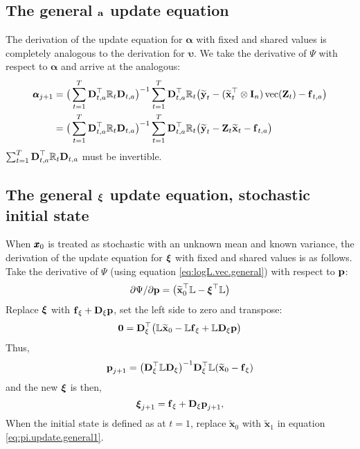 \documentclass[]{article}
\def\uupsilon{\pmb{\upsilon}}
\def\aalpha{\pmb{\alpha}}
\def\xixi{\mbox{\boldmath $\xi$}}
\def\LAMm{\mathbb{L}}
\def\ZZ{\mbox{$\mathbf Z$}}	\def\zz{\mbox{$\mathbf z$}}
\def\DD{\mbox{$\mathbf D$}}	\def\dd{\mbox{$\mathbf d$}}
\def\II{\mbox{$\mathbf I$}} \def\ii{\mbox{$\mathbf i$}}
\def\vec{\,\textup{\textrm{vec}}}
\def\hatxt{\widetilde{\mbox{$\mathbf x$}}_t}
\def\hatyt{\widetilde{\mbox{$\mathbf y$}}_t}
\begin{document}
\subsection{The general $\aa$ update equation}\label{sec:constA}
The derivation of the update equation for $\aalpha$ with fixed and shared values is completely analogous to the derivation for $\uupsilon$. We take the derivative of $\Psi$ with respect to $\aalpha$ and arrive at the analogous:
\begin{equation}\label{eq:general.a.update}
\begin{split}
\aalpha_{j+1} &= \big(\sum_{t=1}^T \DD_{t,a}^\top\Rm_t\DD_{t,a} \big)^{-1}
  \sum_{t=1}^T \DD_{t,a}^\top\Rm_t\big(\hatyt- (\hatxt^\top \otimes \II_n)\vec(\ZZ_t) - \ff_{t,a} \big) \\
  &= \big(\sum_{t=1}^T \DD_{t,a}^\top\Rm_t\DD_{t,a} \big)^{-1}
  \sum_{t=1}^T \DD_{t,a}^\top\Rm_t\big(\hatyt- \ZZ_t\hatxt - \ff_{t,a} \big)
\end{split}
\end{equation}
$\sum_{t=1}^T \DD_{t,a}^\top\Rm_t\DD_{t,a}$ must be invertible.

\subsection{The general $\xixi$ update equation, stochastic initial state}
When $\xx_0$ is treated as stochastic with an unknown mean and known variance, the derivation of the update equation for $\xixi$ with fixed and shared values is as follows. Take the derivative of $\Psi$ (using equation \ref{eq:logL.vec.general}) with respect to $\pp$:
\begin{equation}\label{eq:pi.general1}
\partial\Psi/\partial\pp =  
\big(\widetilde{\mbox{$\mathbf x$}}_0^\top \LAMm - \xixi^\top\LAMm \big)
\end{equation}
Replace $\xixi$ with $\ff_\xi + \DD_\xi\pp$, set the left side to zero and transpose:
\begin{equation}\label{eq:pi.general2}
\mathbf{0} = 
\DD_\xi^\top\big(\LAMm\widetilde{\mbox{$\mathbf x$}}_0 - \LAMm\ff_\xi + \LAMm\DD_\xi\pp \big) 
\end{equation}
Thus,
\begin{equation}\label{eq:pi.update.general1}
\pp_{j+1} = \big(\DD_\xi^\top\LAMm\DD_\xi \big)^{-1}
\DD_\xi^\top\LAMm(\widetilde{\mbox{$\mathbf x$}}_0 - \ff_\xi)
\end{equation}
and the new $\xixi$ is then,
\begin{equation}\label{eq:pi.update.general2}
\xixi_{j+1} = \ff_\xi + \DD_\xi\pp_{j+1},
\end{equation}
When the initial state is defined as at $t=1$, replace $\widetilde{\mbox{$\mathbf x$}}_0$ with $\widetilde{\mbox{$\mathbf x$}}_1$ in equation \ref{eq:pi.update.general1}.
\end{document}
